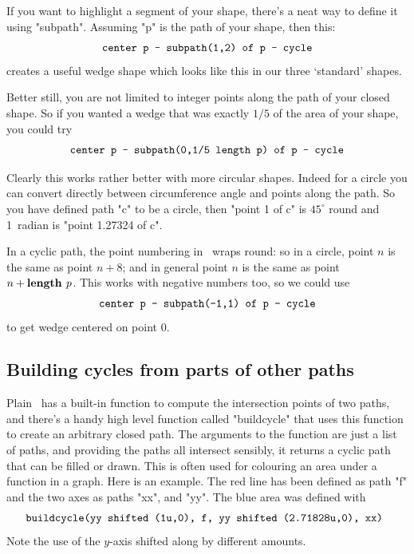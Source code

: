 \documentclass[a4paper,landscape]{article}
\def\mpic#1#2{\vadjust{\moveright5.5in\vbox to 0pt{\vskip#1\texttt{[image: \#2]}\vss}}}
\begin{document}
\vfill\noindent
If you want to highlight a segment of your shape, there’s a neat way to define it
using "subpath".  Assuming "p" is the path of your shape, then this:
$$\hbox{\ttfamily center p -- subpath(1,2) of p -- cycle}$$
creates a useful wedge shape which looks like this in our three ‘standard’
shapes.

\vfill\noindent
Better still, you are not limited to integer points along the path of your closed shape.
So if you wanted a wedge that was exactly $1/5$ of the area of your shape, you
could try
$$\hbox{\ttfamily center p -- subpath(0,1/5 length p) of p -- cycle}$$

Clearly this works rather better with more circular shapes.  Indeed for a circle you
can convert directly between circumference angle and points along the path.  So
you have defined path "c" to be a circle, then
"point 1 of c" is $45^\circ$ round and 1~radian is "point 1.27324 of c".

\vfill\noindent
In a cyclic path, the point numbering in \MP\ wraps round: so in a
circle, point $n$ is the same as point $n+8$; and in general point $n$ is the same as
point $n+\hbox{\bf length }p$.  This works with negative numbers too, so we could use 
$$\hbox{\ttfamily center p -- subpath(-1,1) of p -- cycle}$$
to get wedge centered on point 0.

\newpage\subsection{Building cycles from parts of other paths}

Plain \MP\ has a built-in function to compute the intersection points of two paths, and
there’s a handy high level function called "buildcycle" that uses this function to
create an arbitrary closed path.  
\mpic{0pt}{area-under-graph1}
The arguments to the function are just a list of paths, and providing the paths all
intersect sensibly, it
returns a cyclic path that can be filled or drawn.  This is often used for colouring an
area under a function in a graph.
Here is an example. The red line has been defined
as path "f" and the two axes as paths "xx", and "yy".  The blue area was defined
with
$$\hbox{\ttfamily 
buildcycle(yy shifted (1u,0), f, yy shifted (2.71828u,0), xx)
}$$
Note the use of the $y$-axis shifted along by different amounts.
\end{document}
